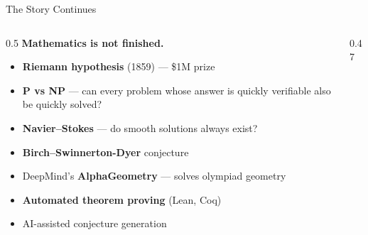 \begin{frame}[shrink=25]{The Story Continues}

  \begin{columns}[T]
    \begin{column}{0.5\textwidth}
      {\normalsize\bfseries Mathematics is not finished.}

      \vspace{0.5em}
      \begin{tcolorbox}[colback=aiViolet!5, colframe=aiViolet, rounded corners,
        boxrule=0.7pt, left=3pt, right=3pt, top=3pt, bottom=3pt,
        fonttitle=\bfseries\small, title={Open Problems}]
        \small
        \begin{itemize}\setlength\itemsep{3pt}
          \item \textbf{Riemann hypothesis} (1859) --- \$1M prize
          \item \textbf{P vs NP} --- can every problem whose answer is
                quickly verifiable also be quickly solved?
          \item \textbf{Navier--Stokes} --- do smooth solutions always exist?
          \item \textbf{Birch--Swinnerton-Dyer} conjecture
        \end{itemize}
      \end{tcolorbox}

      \vspace{0.3em}
      \begin{tcolorbox}[colback=accentOrange!5, colframe=accentOrange, rounded corners,
        boxrule=0.7pt, left=3pt, right=3pt, top=3pt, bottom=3pt,
        fonttitle=\bfseries\small, title={AI Discovers Mathematics}]
        \small
        \begin{itemize}\setlength\itemsep{2pt}
          \item DeepMind's \textbf{AlphaGeometry} --- solves olympiad geometry
          \item \textbf{Automated theorem proving} (Lean, Coq)
          \item AI-assisted conjecture generation
        \end{itemize}
      \end{tcolorbox}
    \end{column}

    \begin{column}{0.47\textwidth}
    \end{column}
  \end{columns}


\end{frame}
